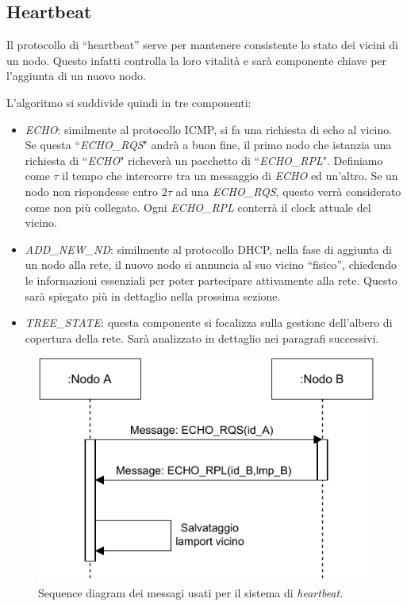 \documentclass[italian]{memoir}
\begin{document}
\subsection{Heartbeat}\label{heartbeat}
Il protocollo di ``heartbeat'' serve per mantenere consistente lo stato dei vicini
	   di un nodo. Questo infatti controlla la loro vitalità e sarà componente chiave
	   per l'aggiunta di un nuovo nodo.

L'algoritmo si suddivide quindi in tre componenti:
\begin{itemize}
	\item \textit{ECHO}: similmente al protocollo ICMP, si fa una richiesta di echo
	   al vicino. Se questa ``\textit{ECHO\_RQS}" andrà a buon fine, il primo nodo che
	   istanzia una richiesta di ``\textit{ECHO}" richeverà un pacchetto di ``\textit{ECHO\_RPL}".
	   Definiamo come $\tau$ il tempo che intercorre tra un messaggio di \textit{ECHO} ed
	   un'altro. Se un nodo non rispondesse entro $2\tau$ ad una \textit{ECHO\_RQS}, questo
	   verrà considerato come non più collegato. Ogni \textit{ECHO\_RPL} conterrà il clock
	   attuale del vicino.
	\item \textit{ADD\_NEW\_ND}: similmente al protocollo DHCP, nella fase di aggiunta
	   di un nodo alla rete, il nuovo nodo si annuncia al suo vicino ``fisico'', chiedendo
	   le informazioni essenziali per poter partecipare attivamente alla rete. Questo sarà
	   spiegato più in dettaglio nella prossima sezione.
	\item \textit{TREE\_STATE}: questa componente si focalizza sulla gestione dell'albero di copertura della rete.
	Sarà analizzato in dettaglio nei paragrafi successivi.
\end{itemize}

\begin{figure}[H]
\centering
\includegraphics{HeartbeatDiagram.pdf}
\caption{Sequence diagram dei messagi usati per il sistema di \textit{heartbeat}.}
\label{img:heartbeat}
\end{figure}
\end{document}
